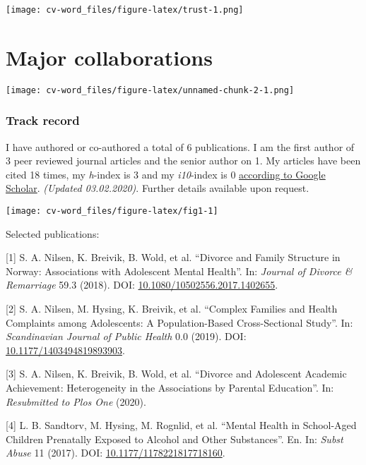 \documentclass[]{article}
\begin{document}
\texttt{[image: cv-word\_files/figure-latex/trust-1.png]}

\hypertarget{major-collaborations}{%
\section{Major collaborations}\label{major-collaborations}}

\texttt{[image: cv-word\_files/figure-latex/unnamed-chunk-2-1.png]}

\hypertarget{track-record}{%
\subsubsection{Track record}\label{track-record}}

I have authored or co-authored a total of 6 publications. I am the first
author of 3 peer reviewed journal articles and the senior author on 1.
My articles have been cited 18 times, my \emph{h}-index is 3 and my
\emph{i10}-index is 0
\href{https://scholar.google.com/citations?user=bat21o8AAAAJ\&hl=en}{according
to Google Scholar}. \emph{(Updated 03.02.2020)}. Further details
available upon request.

\texttt{[image: cv-word\_files/figure-latex/fig1-1]}

Selected publications:

{[}1{]} S. A. Nilsen, K. Breivik, B. Wold, et al. ``Divorce and Family
Structure in Norway: Associations with Adolescent Mental Health''. In:
\emph{Journal of Divorce \& Remarriage} 59.3 (2018). DOI:
\href{https://doi.org/10.1080/10502556.2017.1402655}{10.1080/10502556.2017.1402655}.

{[}2{]} S. A. Nilsen, M. Hysing, K. Breivik, et al. ``Complex Families
and Health Complaints among Adolescents: A Population-Based
Cross-Sectional Study''. In: \emph{Scandinavian Journal of Public
Health} 0.0 (2019). DOI:
\href{https://doi.org/10.1177/1403494819893903}{10.1177/1403494819893903}.

{[}3{]} S. A. Nilsen, K. Breivik, B. Wold, et al. ``Divorce and
Adolescent Academic Achievement: Heterogeneity in the Associations by
Parental Education''. In: \emph{Resubmitted to Plos One} (2020).

{[}4{]} L. B. Sandtorv, M. Hysing, M. Rognlid, et al. ``Mental Health in
School-Aged Children Prenatally Exposed to Alcohol and Other
Substances''. En. In: \emph{Subst Abuse} 11 (2017). DOI:
\href{https://doi.org/10.1177/1178221817718160}{10.1177/1178221817718160}.
\end{document}
